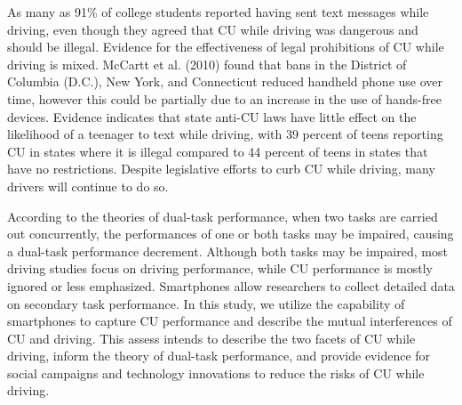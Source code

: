 \documentclass[journal]{IEEEtran}
\begin{document}
As many as 91\% of college students reported having sent text messages while driving, even though they agreed that CU while driving was dangerous and should be illegal. Evidence for the effectiveness of legal prohibitions of CU while driving is mixed.  McCartt et al. (2010) found that bans in the District of Columbia (D.C.), New York, and Connecticut reduced handheld phone use over time, however this could be partially due to an increase in the use of hands-free devices. Evidence indicates that state anti-CU laws have little effect on the likelihood of a teenager to text while driving, with 39 percent of teens reporting CU in states where it is illegal compared to 44 percent of teens in states that have no restrictions. Despite legislative efforts to curb CU while driving, many drivers will continue to do so.

According to the theories of dual-task performance, when two tasks are carried out concurrently, the performances of one or both tasks may be impaired, causing a dual-task performance decrement. Although both tasks may be impaired, most driving studies focus on driving performance, while CU performance is mostly ignored or less emphasized. Smartphones allow researchers to collect detailed data on secondary task performance. In this study, we utilize the capability of smartphones to capture CU performance and describe the mutual interferences of CU and driving. This assess intends to describe the two facets of CU while driving, inform the theory of dual-task performance, and provide evidence for social campaigns and technology innovations to reduce the risks of CU while driving.
\end{document}
